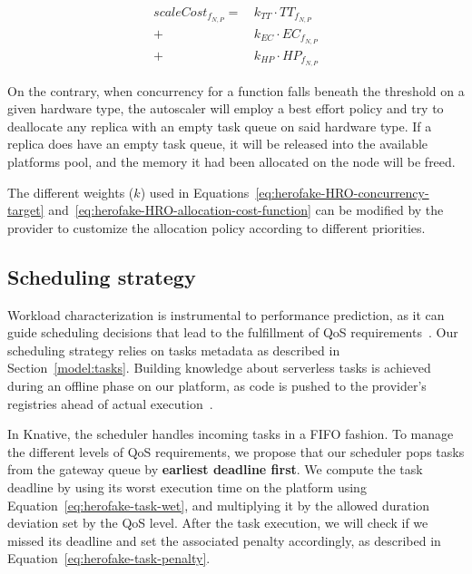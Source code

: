 \begin{equation}
\begin{split}
    scaleCost_{{f}_{N, P}} = \, &k_{TT} \cdot {TT}_{{f}_{N, P}} \\
    + &k_{EC} \cdot {EC}_{{f}_{N, P}} \\
    + &k_{HP} \cdot {HP}_{{f}_{N, P}}
\end{split}
\label{eq:herofake-HRO-allocation-cost-function}
\end{equation}

On the contrary, when concurrency for a function falls beneath the threshold on a given hardware type, the autoscaler will employ a best effort policy and try to deallocate any replica with an empty task queue on said hardware type. If a replica does have an empty task queue, it will be released into the available platforms pool, and the memory it had been allocated on the node will be freed.

The different weights ($k$) used in Equations~\ref{eq:herofake-HRO-concurrency-target} and~\ref{eq:herofake-HRO-allocation-cost-function} can be modified by the provider to customize the allocation policy according to different priorities.

\subsection{Scheduling strategy} \label{section:herofake-scheduling-strategy}

Workload characterization is instrumental to performance prediction, as it can guide scheduling decisions that lead to the fulfillment of QoS requirements~\cite{mampageHolisticViewResource2022}. Our scheduling strategy relies on tasks metadata as described in Section~\ref{model:tasks}. Building knowledge about serverless tasks is achieved during an offline phase on our platform, as code is pushed to the provider's registries ahead of actual execution~\cite{shahradServerlessWildCharacterizing}.

In Knative, the scheduler handles incoming tasks in a FIFO fashion. To manage the different levels of QoS requirements, we propose that our scheduler pops tasks from the gateway queue by \textbf{earliest deadline first}. We compute the task deadline by using its worst execution time on the platform using Equation~\ref{eq:herofake-task-wet}, and multiplying it by the allowed duration deviation set by the QoS level. After the task execution, we will check if we missed its deadline and set the associated penalty accordingly, as described in Equation~\ref{eq:herofake-task-penalty}. 

